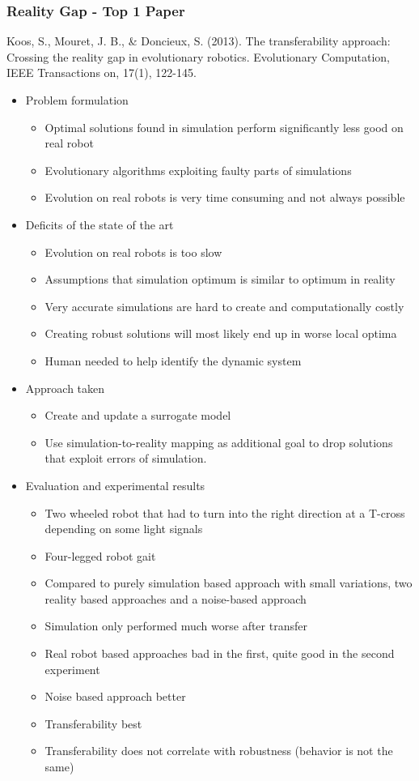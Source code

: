 \documentclass[8pt]{beamer}
\begin{document}
\begin{frame}
\frametitle{Reality Gap - Top 1 Paper}

Koos, S., Mouret, J. B., \& Doncieux, S. (2013). The transferability approach: Crossing the reality gap in evolutionary robotics. Evolutionary Computation, IEEE Transactions on, 17(1), 122-145.

\begin{itemize}
	\item Problem formulation
	\begin{itemize}
		\item Optimal solutions found in simulation perform significantly less good on real robot
		\item Evolutionary algorithms exploiting faulty parts of simulations
		\item Evolution on real robots is very time consuming and not always possible
	\end{itemize}
	\item Deficits of the state of the art
	\begin{itemize}
		\item Evolution on real robots is too slow
		\item Assumptions that simulation optimum is similar to optimum in reality
		\item Very accurate simulations are hard to create and computationally costly
		\item Creating robust solutions will most likely end up in worse local optima
		\item Human needed to help identify the dynamic system		
	\end{itemize}		 
	\item Approach taken
	\begin{itemize}
		\item Create and update a surrogate model
		\item Use simulation-to-reality mapping as additional goal to drop solutions that exploit errors of simulation.
	\end{itemize}
	\item Evaluation and experimental results
	\begin{itemize}
		\item Two wheeled robot that had to turn into the right direction at a T-cross depending on some light signals
		\item Four-legged robot gait
		\item Compared to purely simulation based approach with small variations, two reality based approaches and a noise-based approach
		\item Simulation only performed much worse after transfer
		\item Real robot based approaches bad in the first, quite good in the second experiment
		\item Noise based approach better
		\item Transferability best
		\item Transferability does not correlate with robustness (behavior is not the same)
	\end{itemize}
\end{itemize}

\end{frame}
\end{document}
